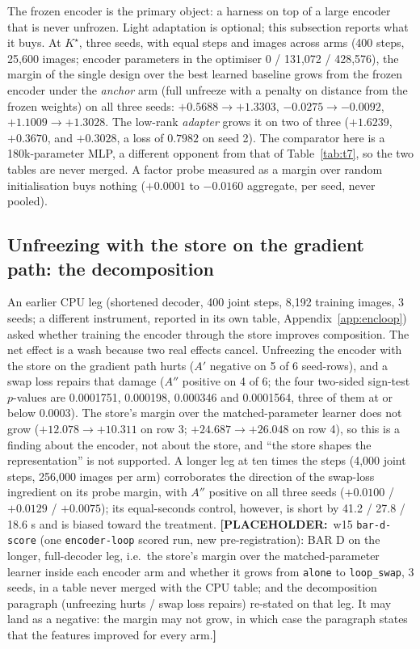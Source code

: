 \documentclass{article} %
\newcommand{\PLACEHOLDER}[1]{{\color{red}\textbf{[PLACEHOLDER:}~#1\textbf{]}}}
\newcommand{\Kstar}{\ensuremath{K^{\star}}}
\begin{document}
The frozen encoder is the primary object: a harness on top of a large encoder that is never
unfrozen. Light adaptation is optional; this subsection reports what it buys. At $\Kstar$, three
seeds, with equal steps and images across arms (400 steps, 25,600 images; encoder parameters in the
optimiser 0 / 131,072 / 428,576), the margin of the single design over the best learned
baseline grows from the frozen encoder under the \emph{anchor} arm (full unfreeze with a
penalty on distance from the frozen weights) on all three seeds: $+0.5688\to+1.3303$,
$-0.0275\to-0.0092$, $+1.1009\to+1.3028$. The low-rank \emph{adapter} grows it on two of
three ($+1.6239$, $+0.3670$, and $+0.3028$, a loss of $0.7982$ on seed 2).
The comparator here is a 180k-parameter MLP, a different opponent from that of
Table~\ref{tab:t7}, so the two tables are never merged. A factor probe measured as a margin over
random initialisation buys nothing ($+0.0001$ to $-0.0160$ aggregate, per seed, never pooled).

\subsection*{Unfreezing with the store on the gradient path: the decomposition}

An earlier CPU leg (shortened decoder, 400 joint steps, 8,192 training images, 3 seeds; a
different instrument, reported in its own table, Appendix~\ref{app:encloop}) asked whether
training the encoder through the store improves composition. The net effect is a wash because two
real effects cancel. Unfreezing the encoder with the store on the gradient path hurts ($A'$
negative on 5 of 6 seed-rows), and a swap loss repairs that damage ($A''$ positive on 4 of 6;
the four two-sided sign-test $p$-values are 0.0001751, 0.000198, 0.000346 and 0.0001564, three
of them at or below 0.0003). The store's margin over
the matched-parameter learner does not grow ($+12.078\to+10.311$ on row 3; $+24.687\to+26.048$
on row 4), so this is a finding about the encoder, not about the store, and ``the store shapes
the representation'' is not supported. %
A longer leg at ten times the steps (4,000 joint steps, 256,000 images per arm) corroborates
the direction of the swap-loss ingredient on its probe margin, with $A''$ positive on all three
seeds ($+0.0100$ / $+0.0129$ / $+0.0075$); its equal-seconds control, however, is short by 41.2 /
27.8 / 18.6 s and is biased toward the treatment. %
\PLACEHOLDER{w15 \texttt{bar-d-score} (one \texttt{encoder-loop} scored run, new
pre-registration): BAR D on the longer, full-decoder leg, i.e.\ the store's margin over the
matched-parameter learner inside each encoder arm and whether it grows from \texttt{alone} to
\texttt{loop\_swap}, 3 seeds, in a table never merged with the CPU table; and the decomposition
paragraph (unfreezing hurts / swap loss repairs) re-stated on that leg. It may land as a
negative: the margin may not grow, in which case the paragraph states that the features
improved for every arm.}
\end{document}
